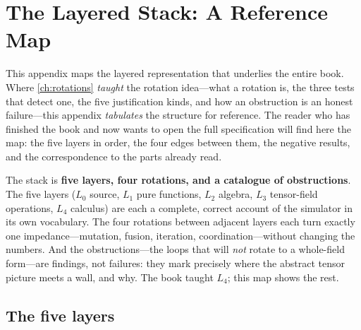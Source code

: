 \chapter{The Layered Stack: A Reference Map}
\label{app:stack}


This appendix maps the layered representation that underlies the entire book. Where
\cref{ch:rotations} \emph{taught} the rotation idea---what a rotation is, the three
tests that detect one, the five justification kinds, and how an obstruction is an
honest failure---this appendix \emph{tabulates} the structure for reference. The
reader who has finished the book and now wants to open the full specification will
find here the map: the five layers in order, the four edges between them, the
negative results, and the correspondence to the parts already read.

\begin{keyidea}
The stack is \textbf{five layers, four rotations, and a catalogue of obstructions}.
The five layers ($L_0$ source, $L_1$ pure functions, $L_2$ algebra, $L_3$
tensor-field operations, $L_4$ calculus) are each a complete, correct account of the
simulator in its own vocabulary. The four rotations between adjacent layers each turn
exactly one impedance---mutation, fusion, iteration, coordination---without changing
the numbers. And the obstructions---the loops that will \emph{not} rotate to a
whole-field form---are findings, not failures: they mark precisely where the
abstract tensor picture meets a wall, and why. The book taught $L_4$; this map shows
the rest.
\end{keyidea}

\section{The five layers}
\label{sec:fivelayers}

